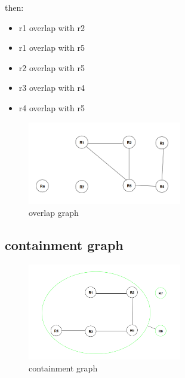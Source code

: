 \documentclass[]{article}
\begin{document}
then:

\begin{itemize}

\item r1 overlap with r2
\item r1 overlap with r5
\item r2 overlap with r5
\item r3 overlap with r4
\item r4 overlap with r5


\end{itemize}












\begin{figure}[H]
	\begin{center}
		\includegraphics[width=0.6\textwidth]{overlap_graph.png}
		\caption{overlap graph}
	\end{center}
\end{figure}

\subsection{containment graph}

\begin{figure}[H]
	\begin{center}
		\includegraphics[width=0.6\textwidth]{cont_graph.png}
		\caption{containment graph}
	\end{center}
\end{figure}
\end{document}
